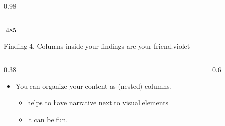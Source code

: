 \documentclass[final,svgnames,english]{beamer}
\begin{document}
\begin{frame}[fragile]{}
\begin{columns}[T]
\begin{column}{0.98\linewidth}
\begin{columns}[T]
\begin{column}{.485\linewidth}
\begin{plainblock}{}
        \begin{findingblock}{Finding 4. Columns inside your findings are your friend.}{violet}
            \begin{columns}[T]
                \begin{column}{0.38\textwidth}
                    \begin{itemize}
                      \item You can organize your content as (nested) columns.
                            \begin{itemize}
                              \item helps to have narrative next to visual elements, 
                              \item it can be fun.
                            \end{itemize}
                    \end{itemize}
                \end{column}
                \begin{column}{0.6\textwidth}
                    \centering
                    
                \end{column}
            \end{columns}
        \end{findingblock}
    \end{plainblock}
    

\end{column}
\end{columns}
\end{column}
\end{columns}
\end{frame}
\end{document}
